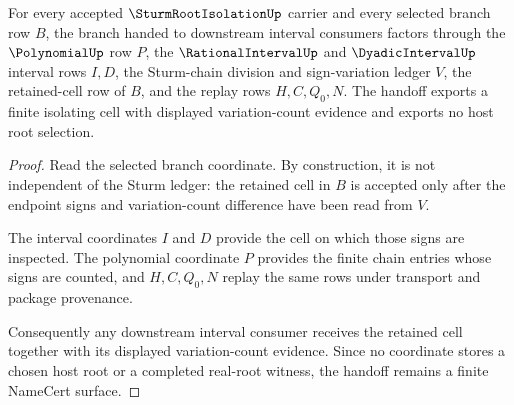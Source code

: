 \begin{theorem}
\label{thm:sturm-root-isolation-sign-variation-handoff}
For every accepted $\SturmRootIsolationUp$ carrier and every selected branch row $B$, the branch handed to downstream interval consumers factors through the $\PolynomialUp$ row $P$, the $\RationalIntervalUp$ and $\DyadicIntervalUp$ interval rows $I,D$, the Sturm-chain division and sign-variation ledger $V$, the retained-cell row of $B$, and the replay rows $H,C,Q_0,N$. The handoff exports a finite isolating cell with displayed variation-count evidence and exports no host root selection.
\end{theorem}
\begin{proof}
Read the selected branch coordinate. By construction, it is not independent of the Sturm ledger: the retained cell in $B$ is accepted only after the endpoint signs and variation-count difference have been read from $V$.

The interval coordinates $I$ and $D$ provide the cell on which those signs are inspected. The polynomial coordinate $P$ provides the finite chain entries whose signs are counted, and $H,C,Q_0,N$ replay the same rows under transport and package provenance.

Consequently any downstream interval consumer receives the retained cell together with its displayed variation-count evidence. Since no coordinate stores a chosen host root or a completed real-root witness, the handoff remains a finite NameCert surface.
\end{proof}

